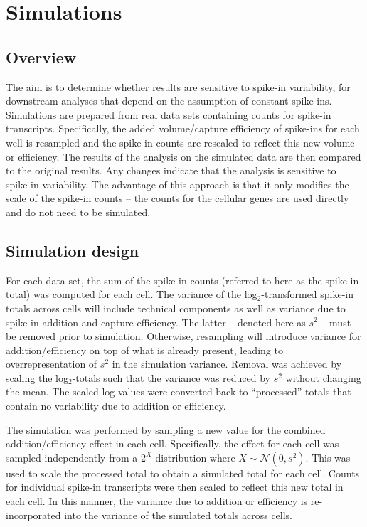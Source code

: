 \documentclass{article}
\begin{document}
\newpage

\section{Simulations}

\subsection{Overview}
The aim is to determine whether results are sensitive to spike-in variability, for downstream analyses that depend on the assumption of constant spike-ins.
Simulations are prepared from real data sets containing counts for spike-in transcripts.
Specifically, the added volume/capture efficiency of spike-ins for each well is resampled and the spike-in counts are rescaled to reflect this new volume or efficiency.
The results of the analysis on the simulated data are then compared to the original results.
Any changes indicate that the analysis is sensitive to spike-in variability.
The advantage of this approach is that it only modifies the scale of the spike-in counts -- the counts for the cellular genes are used directly and do not need to be simulated.

\subsection{Simulation design}
For each data set, the sum of the spike-in counts (referred to here as the spike-in total) was computed for each cell.
The variance of the log$_2$-transformed spike-in totals across cells will include technical components as well as variance due to spike-in addition and capture efficiency.
The latter -- denoted here as $s^2$ -- must be removed prior to simulation.
Otherwise, resampling will introduce variance for addition/efficiency on top of what is already present, leading to overrepresentation of $s^2$ in the simulation variance.
Removal was achieved by scaling the log$_2$-totals such that the variance was reduced by $s^2$ without changing the mean.
The scaled log-values were converted back to ``processed'' totals that contain no variability due to addition or efficiency.

The simulation was performed by sampling a new value for the combined addition/efficiency effect in each cell.
Specifically, the effect for each cell was sampled independently from a $2^X$ distribution where $X \sim \mathcal{N}(0, s^2)$.
This was used to scale the processed total to obtain a simulated total for each cell.
Counts for individual spike-in transcripts were then scaled to reflect this new total in each cell.
In this manner, the variance due to addition or efficiency is re-incorporated into the variance of the simulated totals across cells.
\end{document}
